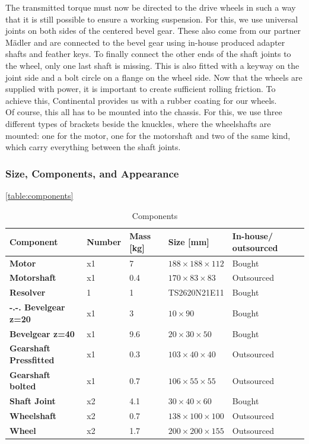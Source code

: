 The transmitted torque must now be directed to the drive wheels in such a way that it is still possible to ensure a working suspension. For this, we use universal joints on both sides of the centered bevel gear. These also come from our partner Mädler and are connected to the bevel gear using in-house produced adapter shafts and feather keys. To finally connect the other ends of the shaft joints to the wheel, only one last shaft is missing. This is also fitted with a keyway on the joint side and a bolt circle on a flange on the wheel side. Now that the wheels are supplied with power, it is important to create sufficient rolling friction. To achieve this, Continental provides us with a rubber coating for our wheels. \\
Of course, this all has to be mounted into the chassis. For this, we use three different types of brackets beside the knuckles, where the wheelshafts are mounted: one for the motor, one for the motorshaft and two of the same kind, which carry everything between the shaft joints.

\subsubsection{Size, Components, and Appearance}

\autoref{table:components}
\begin{table}[ht]
\centering
\begin{adjustbox}{width=\textwidth}
\begin{tabular}{|>{\bfseries}m{2.5cm}|m{1.4cm}|m{1.7cm}|m{2.9cm}|m{2.2cm}|}
\hline
Component & Number & Mass [kg] & Size [mm] &  In-house/ outsourced \\
\hline
Motor & x1 & 7 & \(188 \times 188 \times 112\) &   Bought \\
Motorshaft & x1 & 0.4 & \(170 \times 83\times 83\) &Outsourced \\
Resolver & 1 & 1 & TS2620N21E11 &  Bought \\-.-.
Bevelgear z=20 & x1 & 3 & \(10 \times 90\) &  Bought \\
Bevelgear z=40 & x1 & 9.6 & \(20 \times 30 \times 50\) &Bought \\
Gearshaft Pressfitted & x1 & 0.3 & \(103 \times 40 \times 40\) & Outsourced \\
Gearshaft bolted & x1 & 0.7 & \(106 \times 55 \times 55\) &Outsourced \\
Shaft Joint & x2 & 4.1 & \(30 \times 40 \times 60\) &  Bought \\
Wheelshaft & x2 & 0.7 & \(138 \times 100 \times 100\) &   Outsourced \\
Wheel & x2 & 1.7 & \(200 \times 200 \times 155\) &  Outsourced \\
\hline
\end{tabular}
\end{adjustbox}
\caption{Components}
\label{table:components}
\end{table}


